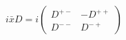 \begin{equation}
i\bar{x}D=i \left(
\begin{array}{cc}
D^{+-} &-D^{++} \\
D^{--} & D^{-+}
\end{array}
\right)
\end{equation}

